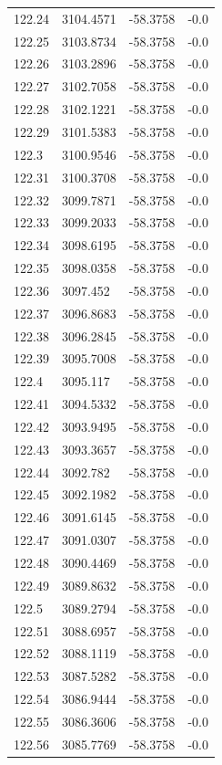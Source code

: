 \begin{table}[H]
\begin{tabular}{llll}
122.24 & 3104.4571 & -58.3758 & -0.0 \\
122.25 & 3103.8734 & -58.3758 & -0.0 \\
122.26 & 3103.2896 & -58.3758 & -0.0 \\
122.27 & 3102.7058 & -58.3758 & -0.0 \\
122.28 & 3102.1221 & -58.3758 & -0.0 \\
122.29 & 3101.5383 & -58.3758 & -0.0 \\
122.3 & 3100.9546 & -58.3758 & -0.0 \\
122.31 & 3100.3708 & -58.3758 & -0.0 \\
122.32 & 3099.7871 & -58.3758 & -0.0 \\
122.33 & 3099.2033 & -58.3758 & -0.0 \\
122.34 & 3098.6195 & -58.3758 & -0.0 \\
122.35 & 3098.0358 & -58.3758 & -0.0 \\
122.36 & 3097.452 & -58.3758 & -0.0 \\
122.37 & 3096.8683 & -58.3758 & -0.0 \\
122.38 & 3096.2845 & -58.3758 & -0.0 \\
122.39 & 3095.7008 & -58.3758 & -0.0 \\
122.4 & 3095.117 & -58.3758 & -0.0 \\
122.41 & 3094.5332 & -58.3758 & -0.0 \\
122.42 & 3093.9495 & -58.3758 & -0.0 \\
122.43 & 3093.3657 & -58.3758 & -0.0 \\
122.44 & 3092.782 & -58.3758 & -0.0 \\
122.45 & 3092.1982 & -58.3758 & -0.0 \\
122.46 & 3091.6145 & -58.3758 & -0.0 \\
122.47 & 3091.0307 & -58.3758 & -0.0 \\
122.48 & 3090.4469 & -58.3758 & -0.0 \\
122.49 & 3089.8632 & -58.3758 & -0.0 \\
122.5 & 3089.2794 & -58.3758 & -0.0 \\
122.51 & 3088.6957 & -58.3758 & -0.0 \\
122.52 & 3088.1119 & -58.3758 & -0.0 \\
122.53 & 3087.5282 & -58.3758 & -0.0 \\
122.54 & 3086.9444 & -58.3758 & -0.0 \\
122.55 & 3086.3606 & -58.3758 & -0.0 \\
122.56 & 3085.7769 & -58.3758 & -0.0 \\

\end{tabular}
\end{table}
